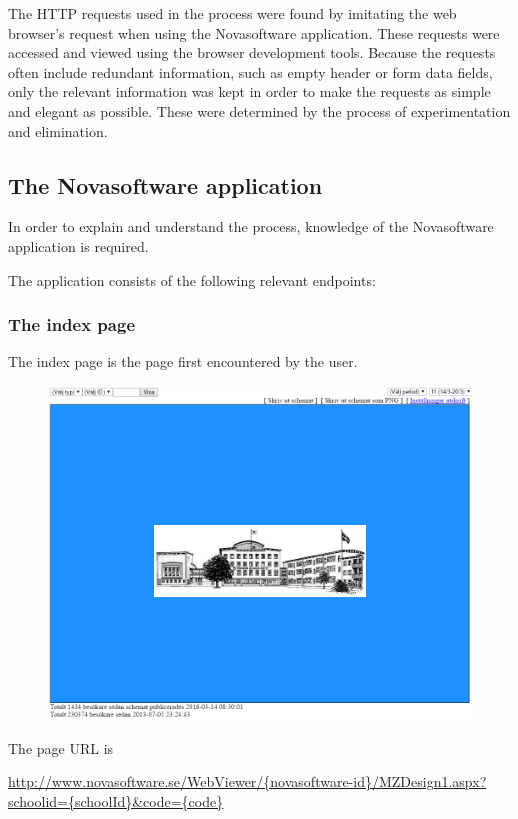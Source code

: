 \documentclass{article}
\begin{document}
	The HTTP requests used in the process were found by imitating the web browser's request when using the Novasoftware application. These requests were accessed and viewed using the browser development tools. Because the requests often include redundant information, such as empty header or form data fields, only the relevant information was kept in order to make the requests as simple and elegant as possible. These were determined by the process of experimentation and elimination.
	
	\subsection{The Novasoftware application}
	In order to explain and understand the process, knowledge of the Novasoftware application is required.
	
	The application consists of the following relevant endpoints:
	
	\subsubsection{The index page}
	The index page is the page first encountered by the user.
	
	\begin{figure}[h]
		\centering
		\includegraphics[width=0.9\linewidth]{images/index-page}
		\caption{}
		\label{fig:index-page}
	\end{figure}
	
	The page URL is
	
	\url{http://www.novasoftware.se/WebViewer/{novasoftware-id}/MZDesign1.aspx?schoolid={schoolId}&code={code}}
	
\end{document}
